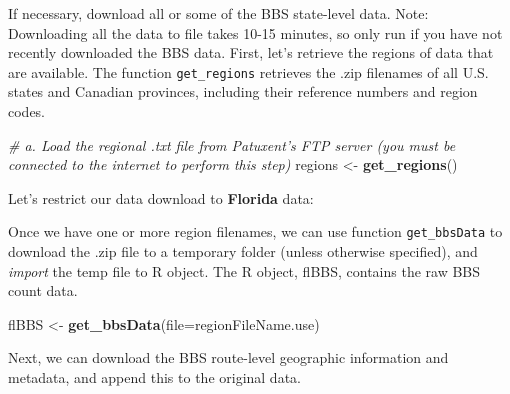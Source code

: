 \documentclass[12pt,twoside,openany]{reedthesis}
\newenvironment{Shaded}{\begin{snugshade}}{\end{snugshade}}
\newcommand{\CommentTok}[1]{\textcolor[rgb]{0.56,0.35,0.01}{\textit{#1}}}
\newcommand{\ControlFlowTok}[1]{\textcolor[rgb]{0.13,0.29,0.53}{\textbf{#1}}}
\newcommand{\DataTypeTok}[1]{\textcolor[rgb]{0.13,0.29,0.53}{#1}}
\newcommand{\KeywordTok}[1]{\textcolor[rgb]{0.13,0.29,0.53}{\textbf{#1}}}
\newcommand{\NormalTok}[1]{#1}
\newcommand{\OperatorTok}[1]{\textcolor[rgb]{0.81,0.36,0.00}{\textbf{#1}}}
\newcommand{\OtherTok}[1]{\textcolor[rgb]{0.56,0.35,0.01}{#1}}
\newcommand{\StringTok}[1]{\textcolor[rgb]{0.31,0.60,0.02}{#1}}
\begin{document}
If necessary, download all or some of the BBS state-level data. Note: Downloading all the data to file takes 10-15 minutes, so only run if you have not recently downloaded the BBS data. First, let's retrieve the regions of data that are available. The function \texttt{get\_regions} retrieves the .zip filenames of all U.S. states and Canadian provinces, including their reference numbers and region codes.
\begin{Shaded}
\begin{Highlighting}[]
\CommentTok{# a. Load the regional .txt file from Patuxent's FTP server (you must be connected to the internet to perform this step)}
\NormalTok{regions <-}\StringTok{ }\KeywordTok{get_regions}\NormalTok{()}
\end{Highlighting}
\end{Shaded}
Let's restrict our data download to \textbf{Florida} data:
\begin{Shaded}
\end{Shaded}
Once we have one or more region filenames, we can use function \texttt{get\_bbsData} to download the .zip file to a temporary folder (unless otherwise specified), and \emph{import} the temp file to R object. The R object, flBBS, contains the raw BBS count data.
\begin{Shaded}
\begin{Highlighting}[]
\NormalTok{flBBS <-}\StringTok{ }\KeywordTok{get_bbsData}\NormalTok{(}\DataTypeTok{file=}\NormalTok{regionFileName.use)}
\end{Highlighting}
\end{Shaded}
Next, we can download the BBS route-level geographic information and metadata, and append this to the original data.
\begin{Shaded}
\end{Shaded}
\end{document}
